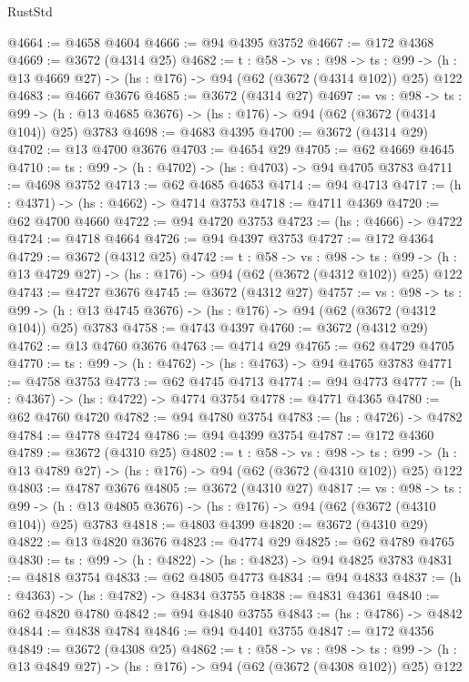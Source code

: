 \begin{lexlean}{RustStd}
\begin{coremodule}
@4664 := @4658 @4604
@4666 := @94 @4395 @3752
@4667 := @172 @4368
@4669 := @3672 (@4314 @25)
@4682 := {t : @58} ->
  {vs : @98} ->
  {ts : @99} -> (h : @13 @4669 @27) -> (hs : @176) -> @94 (@62 (@3672 (@4314 @102)) @25) @122
@4683 := @4667 @3676
@4685 := @3672 (@4314 @27)
@4697 := {vs : @98} ->
  {ts : @99} -> (h : @13 @4685 @3676) -> (hs : @176) -> @94 (@62 (@3672 (@4314 @104)) @25) @3783
@4698 := @4683 @4395
@4700 := @3672 (@4314 @29)
@4702 := @13 @4700 @3676
@4703 := @4654 @29
@4705 := @62 @4669 @4645
@4710 := {ts : @99} -> (h : @4702) -> (hs : @4703) -> @94 @4705 @3783
@4711 := @4698 @3752
@4713 := @62 @4685 @4653
@4714 := @94 @4713
@4717 := (h : @4371) -> (hs : @4662) -> @4714 @3753
@4718 := @4711 @4369
@4720 := @62 @4700 @4660
@4722 := @94 @4720 @3753
@4723 := (hs : @4666) -> @4722
@4724 := @4718 @4664
@4726 := @94 @4397 @3753
@4727 := @172 @4364
@4729 := @3672 (@4312 @25)
@4742 := {t : @58} ->
  {vs : @98} ->
  {ts : @99} -> (h : @13 @4729 @27) -> (hs : @176) -> @94 (@62 (@3672 (@4312 @102)) @25) @122
@4743 := @4727 @3676
@4745 := @3672 (@4312 @27)
@4757 := {vs : @98} ->
  {ts : @99} -> (h : @13 @4745 @3676) -> (hs : @176) -> @94 (@62 (@3672 (@4312 @104)) @25) @3783
@4758 := @4743 @4397
@4760 := @3672 (@4312 @29)
@4762 := @13 @4760 @3676
@4763 := @4714 @29
@4765 := @62 @4729 @4705
@4770 := {ts : @99} -> (h : @4762) -> (hs : @4763) -> @94 @4765 @3783
@4771 := @4758 @3753
@4773 := @62 @4745 @4713
@4774 := @94 @4773
@4777 := (h : @4367) -> (hs : @4722) -> @4774 @3754
@4778 := @4771 @4365
@4780 := @62 @4760 @4720
@4782 := @94 @4780 @3754
@4783 := (hs : @4726) -> @4782
@4784 := @4778 @4724
@4786 := @94 @4399 @3754
@4787 := @172 @4360
@4789 := @3672 (@4310 @25)
@4802 := {t : @58} ->
  {vs : @98} ->
  {ts : @99} -> (h : @13 @4789 @27) -> (hs : @176) -> @94 (@62 (@3672 (@4310 @102)) @25) @122
@4803 := @4787 @3676
@4805 := @3672 (@4310 @27)
@4817 := {vs : @98} ->
  {ts : @99} -> (h : @13 @4805 @3676) -> (hs : @176) -> @94 (@62 (@3672 (@4310 @104)) @25) @3783
@4818 := @4803 @4399
@4820 := @3672 (@4310 @29)
@4822 := @13 @4820 @3676
@4823 := @4774 @29
@4825 := @62 @4789 @4765
@4830 := {ts : @99} -> (h : @4822) -> (hs : @4823) -> @94 @4825 @3783
@4831 := @4818 @3754
@4833 := @62 @4805 @4773
@4834 := @94 @4833
@4837 := (h : @4363) -> (hs : @4782) -> @4834 @3755
@4838 := @4831 @4361
@4840 := @62 @4820 @4780
@4842 := @94 @4840 @3755
@4843 := (hs : @4786) -> @4842
@4844 := @4838 @4784
@4846 := @94 @4401 @3755
@4847 := @172 @4356
@4849 := @3672 (@4308 @25)
@4862 := {t : @58} ->
  {vs : @98} ->
  {ts : @99} -> (h : @13 @4849 @27) -> (hs : @176) -> @94 (@62 (@3672 (@4308 @102)) @25) @122

\end{coremodule}
\end{lexlean}
